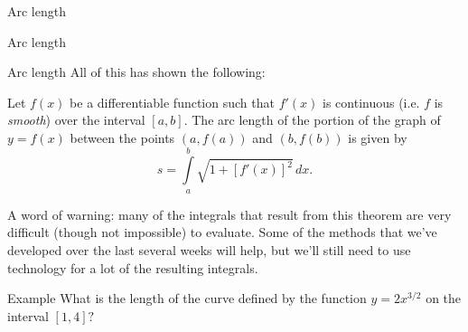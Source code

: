\documentclass[presentation]{beamer}
\begin{document}
\begin{frame}[label={sec:org67d2f2c}]{Arc length}
\end{frame}

\begin{frame}[label={sec:orgdf1e8a0}]{Arc length}
\end{frame}

\begin{frame}[label={sec:org60e2fd7}]{Arc length}
All of this has shown the following:
\begin{theorem}
Let \(f \left( x \right)\) be a differentiable function such that
\(f' \left( x \right)\) is continuous (i.e. \(f\) is \emph{smooth}) over
the interval \(\left[ a,b \right].\) The arc length of the portion of
the graph of \(y = f \left( x \right)\) between the points \(\left( a,f
\left( a \right) \right)\) and \(\left( b,f \left( b \right) \right)\) is given by
\[
s = \int\limits_a^b \sqrt{1 + \left[ f' \left( x \right) \right]^2}\,dx. \]
\end{theorem}

A word of warning:  many of the integrals that result from this
theorem are very difficult (though not impossible) to evaluate.  Some
of the methods that we've developed over the last several weeks will
help, but we'll still need to use technology for a lot of the
resulting integrals.
\end{frame}
\begin{frame}[label={sec:org5303f0c}]{Example}
What is the length of the curve defined by the function \(y = 2x^{3/2}\) on the interval \(\left[ 1,4 \right]?\)

\vspace{10in}
\end{frame}
\end{document}

